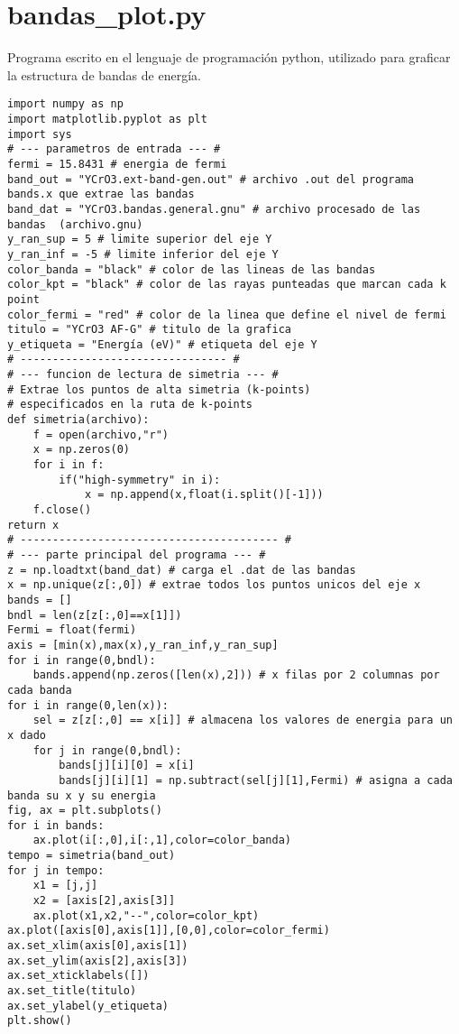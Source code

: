 \section{bandas\_plot.py}

Programa escrito en el lenguaje de programaci\'on python, utilizado para graficar la estructura de bandas de energ\'ia.

\lstset{language=Python, breaklines=true}
\begin{lstlisting}
import numpy as np
import matplotlib.pyplot as plt
import sys
# --- parametros de entrada --- #
fermi = 15.8431 # energia de fermi
band_out = "YCrO3.ext-band-gen.out" # archivo .out del programa bands.x que extrae las bandas
band_dat = "YCrO3.bandas.general.gnu" # archivo procesado de las bandas  (archivo.gnu)
y_ran_sup = 5 # limite superior del eje Y
y_ran_inf = -5 # limite inferior del eje Y
color_banda = "black" # color de las lineas de las bandas
color_kpt = "black" # color de las rayas punteadas que marcan cada k point
color_fermi = "red" # color de la linea que define el nivel de fermi
titulo = "YCrO3 AF-G" # titulo de la grafica
y_etiqueta = "Energía (eV)" # etiqueta del eje Y
# -------------------------------- #
# --- funcion de lectura de simetria --- #
# Extrae los puntos de alta simetria (k-points)
# especificados en la ruta de k-points
def simetria(archivo):
    f = open(archivo,"r")
    x = np.zeros(0)
    for i in f:
        if("high-symmetry" in i):
            x = np.append(x,float(i.split()[-1]))
    f.close()
return x
# ---------------------------------------- #
# --- parte principal del programa --- #
z = np.loadtxt(band_dat) # carga el .dat de las bandas
x = np.unique(z[:,0]) # extrae todos los puntos unicos del eje x
bands = []
bndl = len(z[z[:,0]==x[1]])
Fermi = float(fermi)
axis = [min(x),max(x),y_ran_inf,y_ran_sup]
for i in range(0,bndl):
    bands.append(np.zeros([len(x),2])) # x filas por 2 columnas por cada banda
for i in range(0,len(x)):
    sel = z[z[:,0] == x[i]] # almacena los valores de energia para un x dado
    for j in range(0,bndl):
        bands[j][i][0] = x[i]
        bands[j][i][1] = np.subtract(sel[j][1],Fermi) # asigna a cada banda su x y su energia
fig, ax = plt.subplots()
for i in bands:
    ax.plot(i[:,0],i[:,1],color=color_banda)
tempo = simetria(band_out)
for j in tempo:
    x1 = [j,j]
    x2 = [axis[2],axis[3]]
    ax.plot(x1,x2,"--",color=color_kpt)
ax.plot([axis[0],axis[1]],[0,0],color=color_fermi)
ax.set_xlim(axis[0],axis[1])
ax.set_ylim(axis[2],axis[3])
ax.set_xticklabels([])
ax.set_title(titulo)
ax.set_ylabel(y_etiqueta)
plt.show()
\end{lstlisting}
